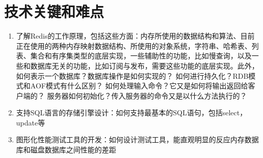 \documentclass[proposal]{zjutreport}
\begin{document}
\section{技术关键和难点}
\begin{enumerate}[label=（\arabic*）]
\item{了解Redis的工作原理，包括这些方面：内存所使用的数据结构和算法、目前正在使用的两种内存映射数据结构、所使用的对象系统，字符串、哈希表、列表、集合和有序集类型的底层实现，一些辅助性的功能，比如慢查询，以及一些和数据库无关的功能，比如订阅与发布，需要这些功能的底层实现。此外，如何表示一个数据库？数据库操作是如何实现的？
如何进行持久化？RDB模式和AOF模式有什么区别？
如何处理输入命令？它又是如何将输出返回给客户端的？
服务器如何初始化？传入服务器的命令又是以什么方法执行的？}
\item{支持SQL语言的存储引擎设计：如何支持最基本的SQL语句，包括select，update等}
\item{图形化性能测试工具的开发：如何设计测试工具，能直观明显的反应内存数据库和磁盘数据库之间性能的差距}
\end{enumerate}

\newpage
\end{document}
